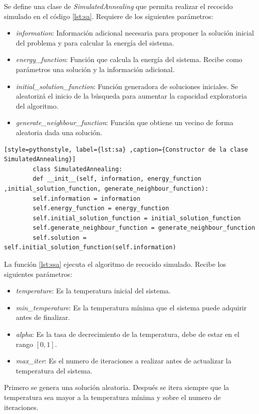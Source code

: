 \documentclass[12pt,twoside]{article}
\begin{document}
	Se define una clase de \textit{SimulatedAnnealing} que permita realizar el recocido simulado en el código \ref{lst:sa}. Requiere de los siguientes parámetros:
	\begin{itemize}
		\item \textit{information}: Información adicional necesaria para proponer la solución inicial del problema y para calcular la energía del sistema.
		\item \textit{energy\_function}: Función que calcula la energía del sistema. Recibe como parámetros una solución y la información adicional.
		\item \textit{initial\_solution\_function}: Función generadora de soluciones iniciales. Se aleatorizá el inicio de la búsqueda para aumentar la capacidad exploratoria del algoritmo.
		\item \textit{generate\_neighbour\_function}: Función que obtiene un vecino de forma aleatoria dada una solución.
	\end{itemize}
	
	\begin{lstlisting}[style=pythonstyle, label={lst:sa} ,caption={Constructor de la clase SimulatedAnnealing}]
		class SimulatedAnnealing:
		def __init__(self, information, energy_function ,initial_solution_function, generate_neighbour_function):
		self.information = information
		self.energy_function = energy_function
		self.initial_solution_function = initial_solution_function
		self.generate_neighbour_function = generate_neighbour_function
		self.solution = self.initial_solution_function(self.information)
	\end{lstlisting}
	
	La función \ref{lst:ssa} ejecuta el algoritmo de recocido simulado. Recibe los siguientes parámetros:
	\begin{itemize}
		\item \textit{temperature}: Es la temperatura inicial del sistema.
		\item \textit{min\_temperature}: Es la temperatura mínima que el sistema puede adquirir antes de finalizar.
		\item \textit{alpha}: Es la tasa de decrecimiento de la temperatura, debe de estar en el rango $[0, 1]$.
		\item \textit{max\_iter}: Es el numero de iteraciones a realizar antes de actualizar la temperatura del sistema.
	\end{itemize}
	
	Primero se genera una solución aleatoria. Después se itera siempre que la temperatura sea mayor a la temperatura mínima y sobre el numero de iteraciones. 
	
\end{document}
